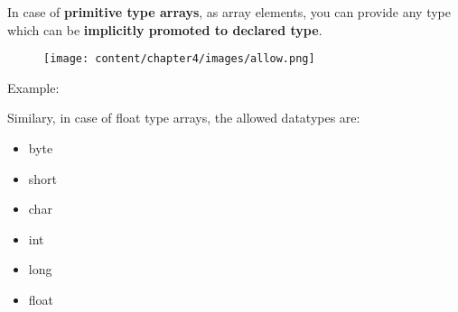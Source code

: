 \setlength{\columnsep}{3pt}
\begin{flushleft}

	In case of \textbf{primitive type arrays}, as array elements, you can provide any type which can be \textbf{implicitly promoted to declared type}.
	\begin{figure}[h!]
		\centering
		\texttt{[image: content/chapter4/images/allow.png]}
	\end{figure}	
	Example:
	
	Similary, in case of float type arrays, the allowed datatypes are:
	\begin{itemize}
		\item byte
		\item short
		\item char
		\item int
		\item long
		\item float
	\end{itemize}
		
\end{flushleft}
